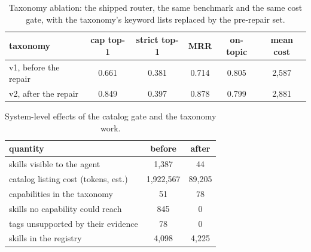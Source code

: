 \documentclass[sigconf,acmsmall]{acmart}
\begin{document}
\begin{table}[t]
\centering
\caption{Taxonomy ablation: the shipped router, the same benchmark and the same cost gate, with the taxonomy's keyword lists replaced by the pre-repair set.}
\label{tab:ablation}
\begin{tabular}{lccccc}
\toprule
\textbf{taxonomy} & \textbf{cap top-1} & \textbf{strict top-1} & \textbf{MRR} & \textbf{on-topic} & \textbf{mean cost} \\
\midrule
v1, before the repair & 0.661 & 0.381 & 0.714 & 0.805 & 2,587 \\
v2, after the repair & 0.849 & 0.397 & 0.878 & 0.799 & 2,881 \\
\bottomrule
\end{tabular}
\end{table}
\begin{table}[t]
\centering
\caption{System-level effects of the catalog gate and the taxonomy work.}
\label{tab:system}
\begin{tabular}{lcc}
\toprule
\textbf{quantity} & \textbf{before} & \textbf{after} \\
\midrule
skills visible to the agent & 1,387 & 44 \\
catalog listing cost (tokens, est.) & 1,922,567 & 89,205 \\
capabilities in the taxonomy & 51 & 78 \\
skills no capability could reach & 845 & 0 \\
tags unsupported by their evidence & 78 & 0 \\
skills in the registry & 4,098 & 4,225 \\
\bottomrule
\end{tabular}
\end{table}
\end{document}
